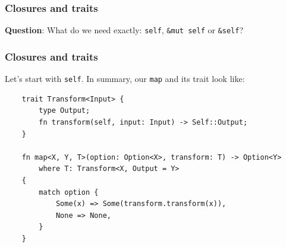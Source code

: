 \documentclass[aspectratio=1610,t]{beamer}
\begin{document}

\begin{frame}[fragile]
\frametitle{Closures and traits}
\textbf{Question}: What do we need exactly: \texttt{self}, \texttt{\&mut self} or \texttt{\&self}?


\end{frame}


\begin{frame}[fragile]
\frametitle{Closures and traits}
Let's start with \texttt{self}. In summary, our \texttt{map} and its trait look like:

\begin{verbatim}
    trait Transform<Input> {
        type Output;
        fn transform(self, input: Input) -> Self::Output;
    }

    fn map<X, Y, T>(option: Option<X>, transform: T) -> Option<Y>
        where T: Transform<X, Output = Y>
    {
        match option {
            Some(x) => Some(transform.transform(x)),
            None => None,
        }
    }
\end{verbatim}
\end{frame}

\end{document}
